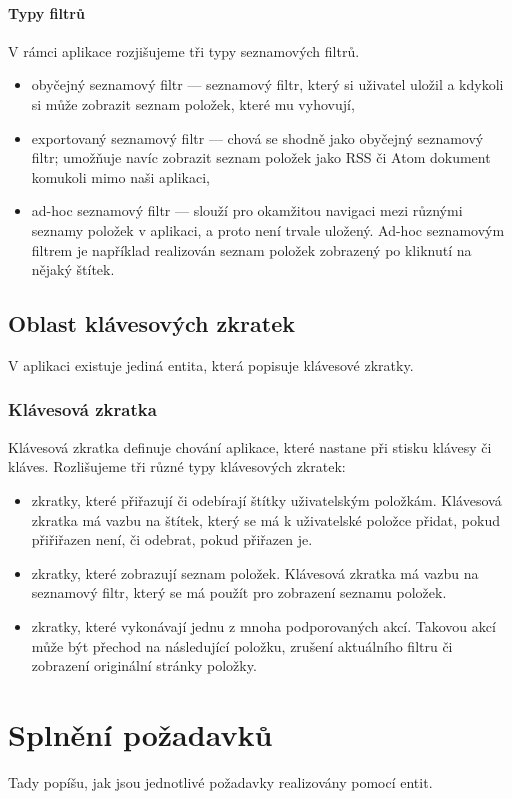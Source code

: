 \paragraph{Typy filtrů}
V rámci aplikace rozjišujeme tři typy seznamových filtrů.
\begin{itemize}
	\item obyčejný seznamový filtr --- seznamový filtr, který si uživatel uložil a kdykoli si může zobrazit seznam položek, které mu vyhovují,
	\item exportovaný seznamový filtr --- chová se shodně jako obyčejný seznamový filtr; umožňuje navíc zobrazit seznam položek jako RSS či Atom dokument komukoli mimo naši aplikaci,
	\item ad-hoc seznamový filtr --- slouží pro okamžitou navigaci mezi různými seznamy položek v aplikaci, a proto není trvale uložený.
		Ad-hoc seznamovým filtrem je například realizován seznam položek zobrazený po kliknutí na nějaký štítek.
\end{itemize}

\subsection{Oblast klávesových zkratek}

V aplikaci existuje jediná entita, která popisuje klávesové zkratky.

\subsubsection{Klávesová zkratka}

Klávesová zkratka definuje chování aplikace, které nastane při stisku klávesy či kláves.
Rozlišujeme tři různé typy klávesových zkratek:
\begin{itemize}
	\item zkratky, které přiřazují či odebírají štítky uživatelským položkám.
		Klávesová zkratka má vazbu na štítek, který se má k uživatelské položce přidat, pokud přiřiřazen není, či odebrat, pokud přiřazen je.
	\item zkratky, které zobrazují seznam položek.
		Klávesová zkratka má vazbu na seznamový filtr, který se má použít pro zobrazení seznamu položek.
	\item zkratky, které vykonávají jednu z mnoha podporovaných akcí.
		Takovou akcí může být přechod na následující položku, zrušení aktuálního filtru či zobrazení originální stránky položky.
\end{itemize}

\section{Splnění požadavků}

Tady popíšu, jak jsou jednotlivé požadavky realizovány pomocí entit.


